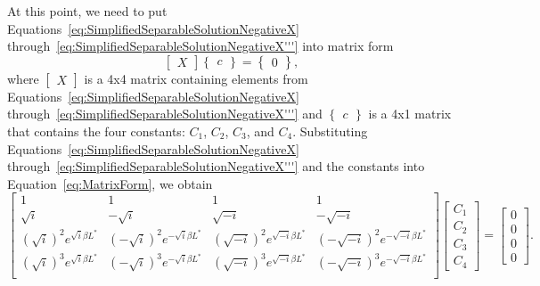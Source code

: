 \documentclass[12pt]{article}
\begin{document}
At this point, we need to put Equations~\eqref{eq:SimplifiedSeparableSolutionNegativeX} through~\eqref{eq:SimplifiedSeparableSolutionNegativeX'''} into matrix form
\begin{equation}\label{eq:MatrixForm}
    \begin{bmatrix}
    X
    \end{bmatrix}
    \begin{Bmatrix}
    c
    \end{Bmatrix}
    =
    \begin{Bmatrix}
    0
    \end{Bmatrix},
\end{equation}
where 
$\begin{bmatrix}
    X
\end{bmatrix}$
is a 4x4 matrix containing elements from Equations~\eqref{eq:SimplifiedSeparableSolutionNegativeX} through~\eqref{eq:SimplifiedSeparableSolutionNegativeX'''} and 
$\begin{Bmatrix}
    c
\end{Bmatrix}$
is a 4x1 matrix that contains the four constants: $C_1$, $C_2$, $C_3$, and $C_4$. Substituting Equations~\eqref{eq:SimplifiedSeparableSolutionNegativeX} through~\eqref{eq:SimplifiedSeparableSolutionNegativeX'''} and the constants into Equation~\eqref{eq:MatrixForm}, we obtain
\begin{equation}\label{eq:MatrixFormSubstitution}
    \begin{bmatrix}
    1 & 1 & 1 & 1\\
    \sqrt{i} & -\sqrt{i} & \sqrt{-i} & -\sqrt{-i}\\
    (\sqrt{i})^2e^{\sqrt{i}\beta L^*} & (-\sqrt{i})^2e^{-\sqrt{i}\beta L^*} & (\sqrt{-i})^2e^{\sqrt{-i}\beta L^*} & (-\sqrt{-i})^2e^{-\sqrt{-i}\beta L^*}\\
    (\sqrt{i})^3e^{\sqrt{i}\beta L^*} & (-\sqrt{i})^3e^{-\sqrt{i}\beta L^*} & (\sqrt{-i})^3e^{\sqrt{-i}\beta L^*} & (-\sqrt{-i})^3e^{-\sqrt{-i}\beta L^*}\\
    \end{bmatrix}
    \begin{bmatrix}
    C_1\\
    C_2\\
    C_3\\
    C_4
    \end{bmatrix}
    =
    \begin{bmatrix}
    0\\
    0\\
    0\\
    0
    \end{bmatrix}.
\end{equation}
\end{document}
